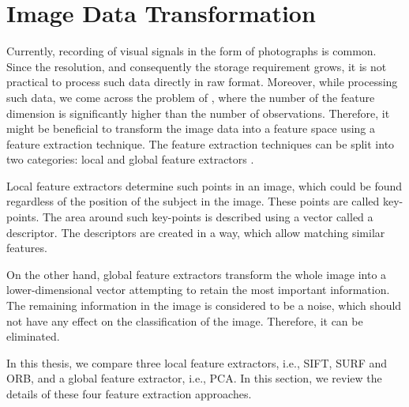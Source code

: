 \chapter{Image Data Transformation}\label{sec:transformation}

Currently, recording of visual signals in the form of photographs is common. Since the resolution, and consequently the storage requirement grows, it is not practical to process such data directly in raw format. Moreover, while processing such data, we come across the problem of , where the number of the feature dimension is significantly higher than the number of observations. Therefore, it might be beneficial to transform the image data into a feature space using a feature extraction technique. The feature extraction techniques can be split into two categories: local and global feature extractors \cite{lee2005}.

Local feature extractors determine such points in an image, which could be found regardless of the position of the subject in the image. These points are called key-points. The area around such key-points is described using a vector called a descriptor. The descriptors are created in a way, which allow matching similar features.

On the other hand, global feature extractors transform the whole image into a lower-dimensional vector attempting to retain the most important information. The remaining information in the image is considered to be a noise, which should not have any effect on the classification of the image. Therefore, it can be eliminated.

In this thesis, we compare three local feature extractors, i.e., SIFT, SURF and ORB, and a global feature extractor, i.e., PCA. In this section, we review the details of these four feature extraction approaches.











